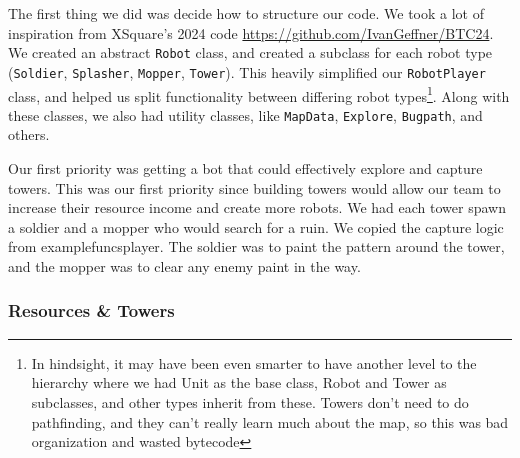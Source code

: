 \documentclass{article}
\begin{document}
  The first thing we did was decide how to structure our code. We took a lot of inspiration from XSquare's 2024 code \url{https://github.com/IvanGeffner/BTC24}. We created an abstract \verb|Robot| class, and created a subclass for each robot type (\verb|Soldier|, \verb|Splasher|, \verb|Mopper|, \verb|Tower|). This heavily simplified our \verb|RobotPlayer| class, and helped us split functionality between differing robot types\footnote{In hindsight, it may have been even smarter to have another level to the hierarchy where we had Unit as the base class, Robot and Tower as subclasses, and other types inherit from these. Towers don't need to do pathfinding, and they can't really learn much about the map, so this was bad organization and wasted bytecode}. Along with these classes, we also had utility classes, like \verb|MapData|, \verb|Explore|, \verb|Bugpath|, and others.

  \medskip

  Our first priority was getting a bot that could effectively explore and capture towers. This was our first priority since building towers would allow our team to increase their resource income and create more robots. We had each tower spawn a soldier and a mopper who would search for a ruin. We copied the capture logic from examplefuncsplayer. The soldier was to paint the pattern around the tower, and the mopper was to clear any enemy paint in the way.

  \subsubsection{Resources \& Towers}
\end{document}
